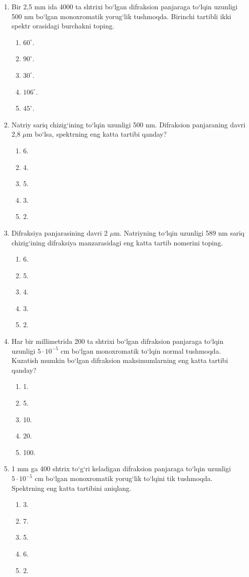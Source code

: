 \begin{enumerate}
\item Bir 2,5 mm ida 4000 ta shtrixi bo‘lgan difraksion panjaraga to‘lqin uzunligi 500 nm bo‘lgan monoxromatik yorug‘lik tushmoqda. Birinchi tartibli ikki spektr orasidagi burchakni toping.
\begin{enumerate}[label=\Alph*)]
\item $60^\circ$.
\item $90^\circ$.
\item $30^\circ$.
\item $106^\circ$.
\item $45^\circ$.
\end{enumerate}

\item Natriy sariq chizig‘ining to‘lqin uzunligi 500 nm. Difraksion panjaraning davri 2,8 $\mu$m bo‘lsa, spektrning eng katta tartibi qanday?
\begin{enumerate}[label=\Alph*)]
\item 6.
\item 4.
\item 5.
\item 3.
\item 2.
\end{enumerate}

\item Difraksiya panjarasining davri 2 $\mu$m. Natriyning to‘lqin uzunligi 589 nm sariq chizig‘ining difraksiya manzarasidagi eng katta tartib nomerini toping.
\begin{enumerate}[label=\Alph*)]
\item 6.
\item 5.
\item 4.
\item 3.
\item 2.
\end{enumerate}

\item Har bir millimetrida 200 ta shtrixi bo‘lgan difraksion panjaraga to‘lqin uzunligi $5\cdot10^{-5}$ cm bo‘lgan monoxromatik to‘lqin normal tushmoqda. Kuzatish mumkin bo‘lgan difraksion maksimumlarning eng katta tartibi qanday?
\begin{enumerate}[label=\Alph*)]
\item 1.
\item 5.
\item 10.
\item 20.
\item 100.
\end{enumerate}

\item 1 mm ga 400 shtrix to‘g‘ri keladigan difraksion panjaraga to‘lqin uzunligi $5\cdot10^{-5}$ cm bo‘lgan monoxromatik yorug‘lik to‘lqini tik tushmoqda. Spektrning eng katta tartibini aniqlang.
\begin{enumerate}[label=\Alph*)]
\item 3.
\item 7.
\item 5.
\item 6.
\item 2.
\end{enumerate}


\end{enumerate}

